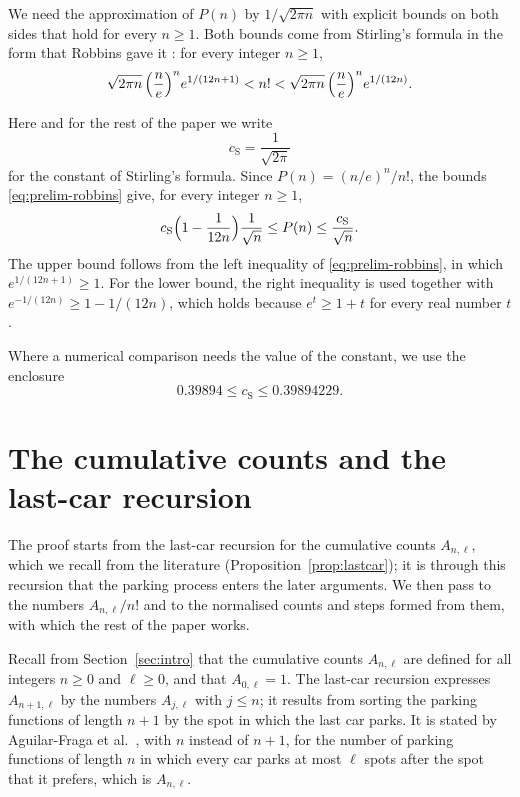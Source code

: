 \documentclass{amsart}
\makeatletter
\theoremstyle{definition}
\theoremstyle{remark}
\numberwithin{equation}{section}
\def\subsection{\@startsection{subsection}{2}\z@{.5\linespacing\@plus.7\linespacing}{-.5em}{\normalfont\bfseries\boldmath}}
\makeatother
\begin{document}
We need the approximation of $P(n)$ by $1/\sqrt{2\pi n}$ with
explicit bounds on both sides that hold for every $n\ge1$. Both bounds come
from Stirling's formula in the form that Robbins gave it
\cite[p.~26, (1) and~(2)]{robbins1955}: for every integer $n\ge1$,
\begin{equation}\label{eq:prelim-robbins}
\sqrt{2\pi n}\,\Bigl(\frac ne\Bigr)^{n}e^{1/(12n+1)}<n!
<\sqrt{2\pi n}\,\Bigl(\frac ne\Bigr)^{n}e^{1/(12n)}.
\end{equation}

Here and for the rest of the paper we write
\[
c_{\mathrm S}=\frac1{\sqrt{2\pi}}
\]
for the constant of Stirling's formula. Since $P(n)=(n/e)^n/n!$, the bounds
\eqref{eq:prelim-robbins} give, for every integer $n\ge1$,
\begin{equation}\label{eq:prelim-stirling}
c_{\mathrm S}\Bigl(1-\frac1{12n}\Bigr)\frac1{\sqrt n}\le P(n)
\le\frac{c_{\mathrm S}}{\sqrt n}.
\end{equation}
The upper bound follows from the left inequality of
\eqref{eq:prelim-robbins}, in which $e^{1/(12n+1)}\ge1$. For the lower
bound, the right inequality is used together with
$e^{-1/(12n)}\ge1-1/(12n)$, which holds because $e^{t}\ge1+t$ for every
real number $t$.

Where a numerical comparison needs the value of the constant, we use the
enclosure
\[
0.39894\le c_{\mathrm S}\le0.39894229.
\]

\section{The cumulative counts and the last-car recursion}\label{sec:counts}
The proof starts from the last-car recursion for the cumulative counts
$A_{n,\ell}$, which we recall from the literature
(Proposition~\ref{prop:lastcar}); it is through this recursion that
the parking process enters the later arguments. We then pass to the numbers
$A_{n,\ell}/n!$ and to the normalised counts and steps formed from them,
with which the rest of the paper works.

\subsection{The last-car recursion}\label{subsec:counts-lastcar}

Recall from Section~\ref{sec:intro} that the cumulative counts $A_{n,\ell}$
are defined for all integers $n\ge0$ and $\ell\ge0$, and that
$A_{0,\ell}=1$.
The last-car recursion expresses $A_{n+1,\ell}$ by the numbers $A_{j,\ell}$
with $j\le n$; it results from sorting the parking functions of length
$n+1$ by the spot in which the last car parks. It is stated by
Aguilar-Fraga et al.\ \cite[Theorem~3.7]{aguilarfraga2024}, with $n$ instead
of $n+1$, for the number of parking functions of length $n$ in which every
car parks at most $\ell$ spots after the spot that it prefers, which is
$A_{n,\ell}$.
\end{document}

